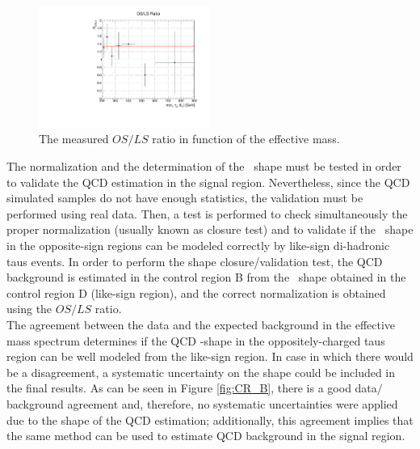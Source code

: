  \begin{figure}[ht]
 \begin{center}
 \captionsetup[subfloat]{farskip=0pt,captionskip=0.0cm,labelformat=empty}
 \includegraphics[clip,width=0.5\textwidth]{figuras/Chapter5/QCD_Estimation/OSLS_Ratio_1p34.pdf}
 \end{center}
 \caption{The measured $OS/LS$ ratio in function of the effective mass.}
  \label{fig:ratio}	
 \end{figure}
 
\noindent The normalization and the determination of the 
\mass~shape must be tested in order to validate 
the QCD estimation in the signal region. Nevertheless, since 
the QCD simulated samples do not have enough statistics,
the validation must be performed using real data. Then, a test 
is performed to check simultaneously the 
proper normalization (usually known as closure test) and 
to validate if the \mass~shape in the opposite-sign regions can be modeled 
correctly by like-sign di-hadronic taus events. In order 
to perform the shape closure/validation test, the QCD background 
is estimated in the control region B from the \mass~shape 
obtained in the control region D (like-sign region), and the correct 
normalization is obtained using the $OS/LS$ ratio. \\


\noindent The agreement between the data and the expected background in the effective
mass spectrum determines if the QCD \mass-shape in the oppositely-charged
taus region can be well modeled from the like-sign region. In case in which
there would be a disagreement, a systematic uncertainty on the shape could be included in 
the final results. As can be seen in Figure \ref{fig:CR_B}, there is a 
good data$/$background agreement and, therefore, no systematic uncertainties were 
applied due to the shape of the QCD estimation; additionally, this agreement 
implies that the same method can be used to estimate QCD background in the signal region.\\
 

